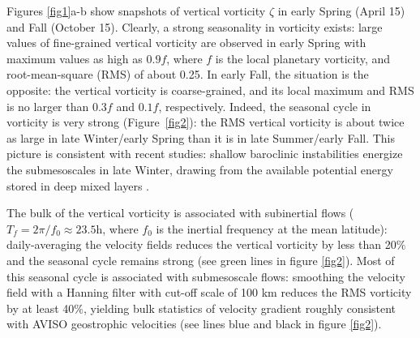 \documentclass[grl]{agutex2015}
\begin{document}
\begin{article}
Figures \ref{fig1}a-b show snapshots of vertical vorticity $\zeta$ in early Spring
(April 15) and Fall (October 15). Clearly, a strong seasonality in vorticity
exists: large values of fine-grained vertical vorticity are
observed in early Spring with maximum values as high as $0.9f$, where $f$ is
the local planetary vorticity, and root-mean-square (RMS) of about 0.25. In early
Fall, the situation is the opposite: the vertical vorticity is coarse-grained,
and its local maximum and RMS is no larger than $0.3f$ and $0.1f$, respectively.
Indeed, the seasonal cycle in vorticity is very strong (Figure~\ref{fig2}):
the RMS vertical vorticity is about twice as large in late Winter/early Spring
than it is in late Summer/early Fall. This picture is consistent with
recent studies: shallow baroclinic instabilities energize the submesoscales
in late Winter, drawing from the available potential energy stored in deep mixed
layers \citep{sasaki_etal2014,callies_etal2015,callies_etal2016}.

The bulk of the vertical vorticity is associated with subinertial flows
($T_f = 2\pi/f_0\approx 23.5$h, where $f_0$ is the inertial frequency at
the mean latitude): daily-averaging the velocity fields reduces the vertical
vorticity by less than 20$\%$ and the seasonal cycle remains strong (see
green lines in figure \ref{fig2}). Most of this seasonal cycle is associated
with submesoscale flows: smoothing the velocity field
with a Hanning filter with cut-off scale of 100 km reduces the RMS vorticity by
at least 40$\%$, yielding bulk statistics of velocity gradient roughly consistent
with AVISO geostrophic velocities (see lines blue and black in figure \ref{fig2}).


\end{article}
\end{document}
